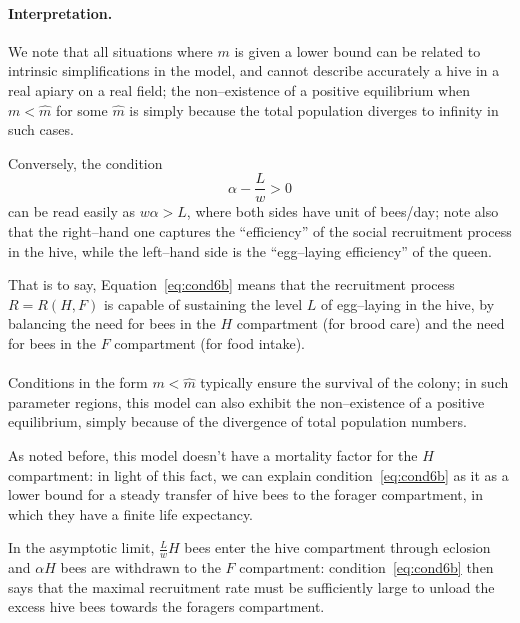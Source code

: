 \paragraph{Interpretation.}
\label{par:interpretationCond6b}
We note that all situations where $m$ is given a lower bound can be related to intrinsic simplifications in the model, and cannot describe accurately a hive in a real apiary on a real field; the non--existence of a positive equilibrium when $m< \hat{m}$ for some $\hat{m}$ is simply because the total population diverges to infinity in such cases.

Conversely, the condition
\begin{equation}
\alpha - \frac{L}{w} > 0
    \label{eq:cond6b}
\end{equation}
can be read easily as $w \alpha >L$, where both sides have unit of bees/day; note also that the right--hand one captures the ``efficiency'' of the social recruitment process in the hive, while the left--hand side is the ``egg--laying efficiency'' of the queen.

That is to say, Equation~\eqref{eq:cond6b} means that the recruitment process $R= R(H, F)$ is capable of sustaining the level $L$ of egg--laying in the hive, by balancing the need for bees in the $H$ compartment (for brood care) and the need for bees in the $F$ compartment (for food intake).

\paragraph{}
Conditions in the form $m< \hat{m}$ typically ensure the survival of the colony;
in such parameter regions, this model can also exhibit the non--existence of a
positive equilibrium, simply because of the divergence of total population numbers.

As noted before, this model doesn't have a mortality factor for the $H$ compartment: in light of this fact, we
can explain condition~\eqref{eq:cond6b} as it as a lower bound for a steady transfer of hive bees to the
forager compartment, in which they have a finite life expectancy.

In the asymptotic limit, $\frac{L}{w} H$ bees enter the hive compartment through eclosion and $\alpha H$ bees
are withdrawn to the $F$ compartment: condition~\eqref{eq:cond6b} then says that the maximal recruitment rate
must be sufficiently large to unload the excess hive bees towards the foragers compartment.

